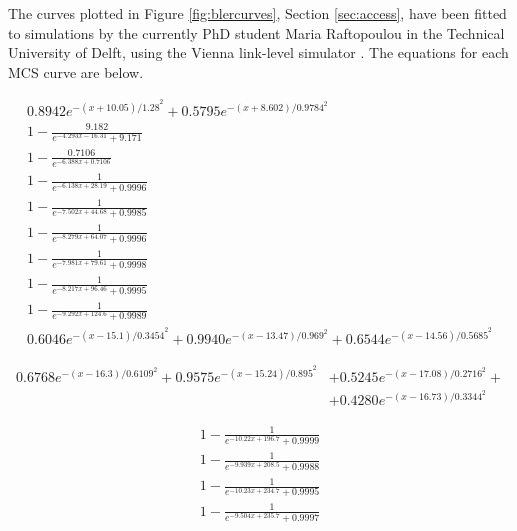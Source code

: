 \label{ap:blercurves}

The curves plotted in Figure \ref{fig:blercurves}, Section \ref{sec:access}, have been fitted to simulations by the currently PhD student Maria Raftopoulou in the Technical University of Delft, using the Vienna link-level simulator \cite{Vienna5GLLS}. The equations for each \acs{MCS} curve are below.


\begin{gather}
    0.8942  e^{-{(x + 10.05) / 1.28}^2} + 0.5795 e^{-{(x + 8.602) / 0.9784}^2}\\
    1 - \frac{9.182}{e^{-4.293 x - 16.31} + 9.171}\\
    1 - \frac{0.7106}{e^{-6.388 x + 0.7106}}\\
    1 -  \frac{1}{e^{-6.138 x + 28.19} + 0.9996}\\
    1 -  \frac{1}{e^{-7.502 x + 44.68} + 0.9985}\\
    1 -  \frac{1}{e^{-8.279 x + 64.07} + 0.9996}\\
    1 -  \frac{1}{e^{-7.981 x + 79.61} + 0.9998}\\
    1 -  \frac{1}{e^{-8.217 x + 96.46} + 0.9995}\\
    1 -  \frac{1}{e^{-9.292 x + 124.6} + 0.9989}\\
    0.6046 e^{-{(x - 15.1) / 0.3454}^2} + 
     0.9940 e^{-{(x - 13.47) / 0.969}^2} + 
     0.6544 e^{-{(x - 14.56) / 0.5685}^2}
\end{gather}

\vspace{-1.5cm}

\begin{align}
    0.6768 e^{-{(x - 16.3) / 0.6109}^2} + 0.9575 e^{-{(x - 15.24) / 0.895}^2} &+ 0.5245 e^{-{(x - 17.08) / 0.2716}^2} + \nonumber \\
     &+ 0.4280 e^{-{(x - 16.73) / 0.3344}^2}
\end{align}

\vspace{-1.5cm}

\begin{gather}
    1 -  \frac{1}{e^{-10.22 x + 196.7} + 0.9999}\\
    1 -  \frac{1}{e^{-9.939 x + 208.5} + 0.9988}\\
    1 -  \frac{1}{e^{-10.23 x + 234.7} + 0.9995}\\
    1 -  \frac{1}{e^{-9.504 x + 235.7} + 0.9997}
\end{gather}

